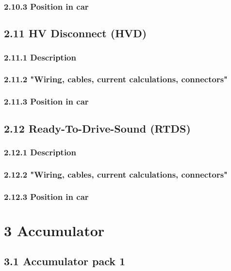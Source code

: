 \documentclass{article}
\begin{document}
\subsubsection*{2.10.3 Position in car}

\subsection*{2.11 HV Disconnect (HVD)}

\subsubsection*{2.11.1 Description}

\subsubsection*{2.11.2 "Wiring, cables, current calculations, connectors"}

\subsubsection*{2.11.3 Position in car}

\subsection*{2.12 Ready-To-Drive-Sound (RTDS)}

\subsubsection*{2.12.1 Description}

\subsubsection*{2.12.2 "Wiring, cables, current calculations, connectors"}

\subsubsection*{2.12.3 Position in car}

\section*{3 Accumulator}

\subsection*{3.1 Accumulator pack 1}
\end{document}
